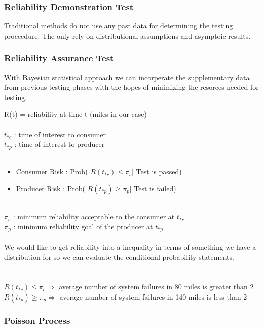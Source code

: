 \documentclass[12pt]{article}
\begin{document}
\subsubsection{Reliability Demonstration Test}
Traditional methods do not use any past data for determining the testing
proceedure.  The only rely on distributional assumptions and asymptoic results.

\subsubsection{Reliability Assurance Test}

With Bayesian statistical approach we can incorperate the supplementary data
from previous testing phases with the hopes of minimizing the resorces needed
for testing.

R(t) = reliability at time t (miles in our case)
\\
\\$ t_{*c} $ : time of interest to consumer
\\$ t_{*p} $ : time of interest to producer
\\
\\
\begin{itemize}
\item Consumer Risk :   Prob( $ R(t_{*c}) \leq \pi_c \vert $ Test is passed)
\item Producer Risk :   Prob( $ R(t_{*p}) \geq \pi_p \vert $ Test is failed)
\end{itemize}
\
\\$ \pi_c $ : minimum reliability acceptable to the consumer at $ t_{*c} $
\\$ \pi_p $ : minimum reliability goal of the producer at $ t_{*p} $
\\
\\
We would like to get reliability into a inequality in terms of something we have
a distribution for so we can evaluate the conditional probability statements.
\\
\\
\\$ R(t_{*c}) \leq \pi_c \Rightarrow $ average number of system failures in 80
miles is greater than 2
\\$ R(t_{*p}) \geq \pi_p \Rightarrow $ average number of system failures in 140
miles is less than 2

\subsubsection{Poisson Process}
\end{document}
